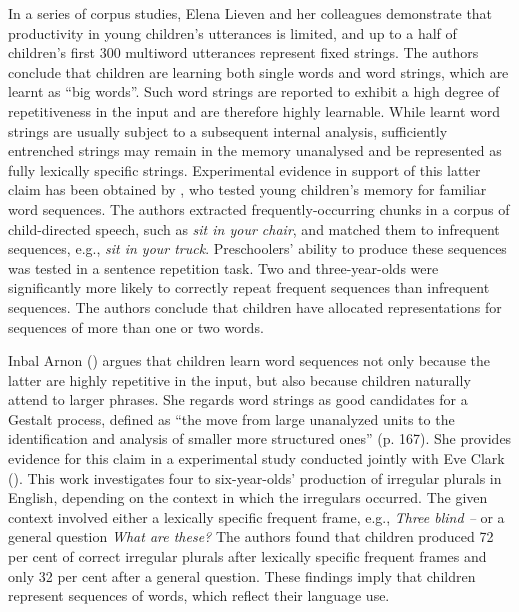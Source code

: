 In a series of corpus studies, Elena Lieven and her colleagues \citep{lieven-pine-baldwin-1997,dabrowska-lieven-2005,lieven-salomo-tomasello-2009} demonstrate that productivity in young children's utterances is limited, and up to a half of children's first 300 multiword utterances represent fixed strings. The authors conclude that children are learning both single words and word strings, which are learnt as ``big words''. Such word strings are reported to exhibit a high degree of repetitiveness in the input and are therefore highly learnable. While learnt word strings are usually subject to a subsequent internal analysis, sufficiently entrenched strings may remain in the memory unanalysed and be represented as fully lexically specific strings. Experimental evidence in support of this latter claim has been obtained by \citet{bannard-matthews-2008}, who tested young children's memory for familiar word sequences. The authors extracted frequently-occurring chunks in a corpus of child-directed speech, such as \textit{sit in your chair}, and matched them to infrequent sequences, e.g., \textit{sit in your truck}. Preschoolers' ability to produce these sequences was tested in a sentence repetition task. Two and three-year-olds were significantly more likely to correctly repeat frequent sequences than infrequent sequences. The authors conclude that children have allocated representations for sequences of more than one or two words. 

Inbal Arnon (\citeyear{arnon-2011}) argues that children learn word sequences not only because the latter are highly repetitive in the input, but also because children naturally attend to larger phrases. She regards word strings as good candidates for a Gestalt process, defined as ``the move from large unanalyzed units to the identification and analysis of smaller more structured ones'' (p. 167). She provides evidence for this claim in a experimental study conducted jointly with Eve Clark (\citeyear{arnon-clark-2011}). This work investigates four to six-year-olds' production of irregular plurals in English, depending on the context in which the irregulars occurred. The given context involved either a lexically specific frequent frame, e.g., \textit{Three blind  -- } or a general question \textit{What are these?} The authors found that children produced 72 per cent of correct irregular plurals after lexically specific frequent frames and only 32 per cent after a general question. These findings imply that children represent sequences of words, which reflect their language use.

